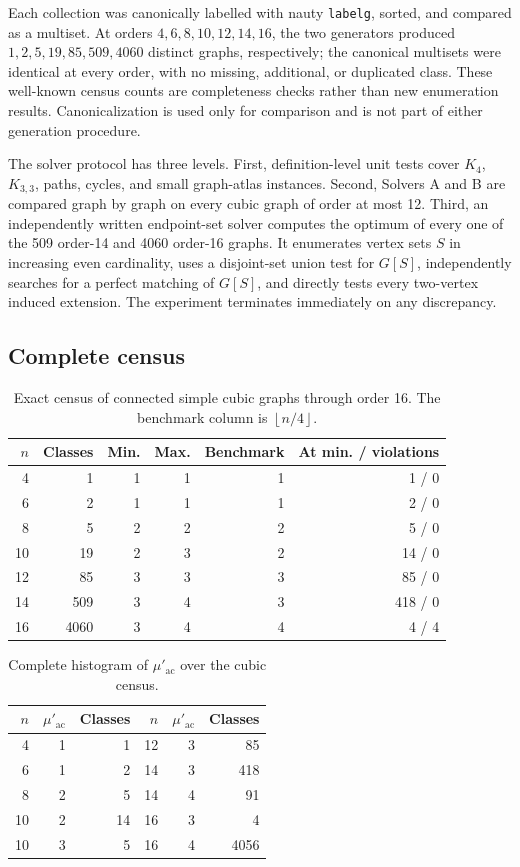 \documentclass[smallextended,natbib,nospthms]{svjour3}
\theoremstyle{definition}
\theoremstyle{remark}
\newcommand{\acnum}{\mu'_{\mathrm{ac}}}
\newcommand{\floor}[1]{\left\lfloor #1\right\rfloor}
\begin{document}
Each collection was canonically labelled with nauty \texttt{labelg}, sorted,
and compared as a multiset. At orders
$4,6,8,10,12,14,16$, the two generators produced
$1,2,5,19,85,509,4060$ distinct graphs, respectively; the canonical multisets
were identical at every order, with no missing, additional, or duplicated
class. These well-known census counts are completeness checks rather than new
enumeration results. Canonicalization is used only for comparison and is not
part of either generation procedure.

The solver protocol has three levels. First, definition-level unit tests cover
$K_4$, $K_{3,3}$, paths, cycles, and small graph-atlas instances. Second,
Solvers A and B are compared graph by graph on every cubic graph of order at
most 12. Third, an independently written endpoint-set solver computes the
optimum of every one of the 509 order-14 and 4060 order-16 graphs. It
enumerates vertex sets $S$ in increasing even cardinality, uses a disjoint-set
union test for $G[S]$, independently searches for a perfect matching of
$G[S]$, and directly tests every two-vertex induced extension. The experiment
terminates immediately on any discrepancy.

\subsection{Complete census}

\begin{table}[t]
\centering
\caption{Exact census of connected simple cubic graphs through order 16. The
benchmark column is $\floor{n/4}$.}
\label{tab:census}
\begin{tabular}{rrrrrr}
\toprule
$n$ & Classes & Min. & Max. & Benchmark & At min. / violations\\
\midrule
4  & 1    & 1 & 1 & 1 & 1 / 0\\
6  & 2    & 1 & 1 & 1 & 2 / 0\\
8  & 5    & 2 & 2 & 2 & 5 / 0\\
10 & 19   & 2 & 3 & 2 & 14 / 0\\
12 & 85   & 3 & 3 & 3 & 85 / 0\\
14 & 509  & 3 & 4 & 3 & 418 / 0\\
16 & 4060 & 3 & 4 & 4 & 4 / 4\\
\bottomrule
\end{tabular}
\end{table}

\begin{table}[t]
\centering
\caption{Complete histogram of $\acnum$ over the cubic census.}
\label{tab:histogram}
\begin{tabular}{rrr@{\qquad}rrr}
\toprule
$n$ & $\acnum$ & Classes & $n$ & $\acnum$ & Classes\\
\midrule
4  & 1 & 1  & 12 & 3 & 85\\
6  & 1 & 2  & 14 & 3 & 418\\
8  & 2 & 5  & 14 & 4 & 91\\
10 & 2 & 14 & 16 & 3 & 4\\
10 & 3 & 5  & 16 & 4 & 4056\\
\bottomrule
\end{tabular}
\end{table}
\end{document}
